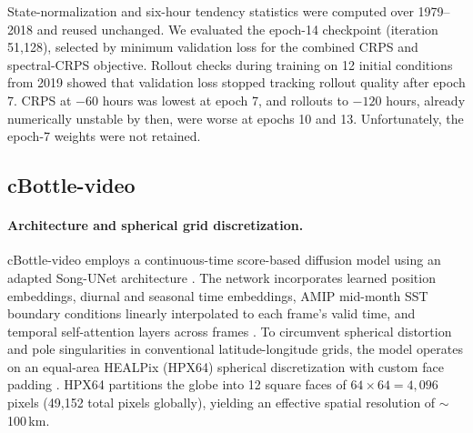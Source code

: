 \documentclass{article}
\begin{document}
State-normalization and six-hour tendency statistics were computed over 1979--2018 and reused unchanged. We evaluated the epoch-14 checkpoint (iteration 51,128), selected by minimum validation loss for the combined CRPS and spectral-CRPS objective. Rollout checks during training on 12 initial conditions from 2019 showed that validation loss stopped tracking rollout quality after epoch 7. CRPS at $-60$ hours was lowest at epoch 7, and rollouts to $-120$ hours, already numerically unstable by then, were worse at epochs 10 and 13. Unfortunately, the epoch-7 weights were not retained.

\subsection{cBottle-video}
\label{sec:methods_cbottle}

\paragraph{Architecture and spherical grid discretization.}
cBottle-video \citep{Brenowitz2025-mz} employs a continuous-time score-based diffusion model using an adapted Song-UNet architecture \citep{Song2020-hs, Karras2022-xq}. The network incorporates learned position embeddings, diurnal and seasonal time embeddings, AMIP mid-month SST boundary conditions linearly interpolated to each
frame's valid time, and temporal self-attention layers across frames \citep{Ho2022-lf, Blattmann2023-zo}. To circumvent spherical distortion and pole singularities in conventional latitude-longitude grids, the model operates on an equal-area HEALPix (HPX64) spherical discretization with custom face padding \citep{Karlbauer2024-nv}. HPX64 partitions the globe into 12 square faces of $64 \times 64 = 4{,}096$ pixels (49,152 total pixels globally), yielding an effective spatial resolution of $\sim$100\,km.
\end{document}

